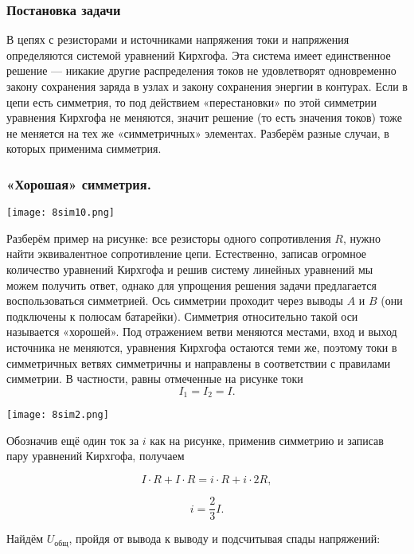 \documentclass[12pt, a4paper]{article}%
\begin{document}
\subsubsection*{Постановка задачи}

В цепях с резисторами и источниками напряжения токи и напряжения определяются системой уравнений Кирхгофа. 
Эта система имеет единственное решение — никакие другие распределения токов не удовлетворят одновременно закону сохранения заряда 
в узлах и закону сохранения энергии в контурах. Если в цепи есть симметрия, то под действием «перестановки» по этой 
симметрии уравнения Кирхгофа не меняются, значит решение (то есть значения токов) тоже не меняется на тех же «симметричных» 
элементах. Разберём разные случаи, в которых применима симметрия. 

\subsubsection*{«Хорошая» симметрия.}

\begin{center}
\texttt{[image: 8sim10.png]}
\label{fig:mpr}
\end{center}

Разберём пример на рисунке: все резисторы одного сопротивления $R$, нужно найти 
эквивалентное сопротивление цепи. Естественно, записав огромное количество уравнений Кирхгофа и решив систему линейных
уравнений мы можем получить ответ, однако для упрощения решения задачи предлагается воспользоваться симметрией. 
Ось симметрии проходит через выводы $A$ и $B$ (они подключены к полюсам батарейки). Симметрия относительно такой оси называется «хорошей».
Под отражением ветви меняются местами, вход и выход источника не меняются, уравнения Кирхгофа остаются теми же,
поэтому токи в симметричных ветвях симметричны и направлены в соответствии с правилами симметрии.
В частности, равны отмеченные на рисунке токи
\[
I_1 = I_2 = I.
\]

\begin{center}
\texttt{[image: 8sim2.png]}
\label{fig:mpr}
\end{center}

Обозначив ещё один ток за $i$ как на рисунке, применив симметрию и записав пару уравнений Кирхгофа, получаем 

\[
I\cdot R + I\cdot R = i\cdot R + i\cdot 2R,
\]

\[
i = \frac23 I.
\]

Найдём $U_\text{общ}$, пройдя от вывода к выводу и подсчитывая спады напряжений:
\end{document}
